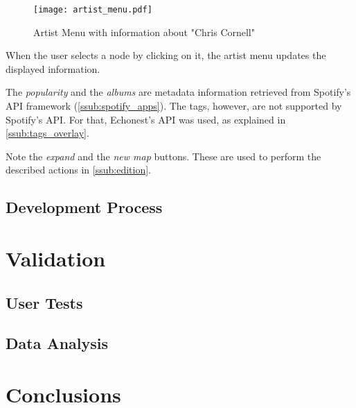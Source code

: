       \begin{figure}[tb]
        \begin{center}
          \texttt{[image: artist\_menu.pdf]}
        \end{center}
        \caption{Artist Menu with information about "Chris Cornell"}
        \label{fig:artist_menu}
      \end{figure}

      When the user selects a node by clicking on it, the artist menu updates the displayed information.

      The \emph{popularity} and the \emph{albums} are metadata information retrieved from Spotify's API framework (\ref{ssub:spotify_apps}).
      The tags, however, are not supported by Spotify's API.
      For that, Echonest's API was used, as explained in \ref{ssub:tags_overlay}.

      Note the \emph{expand} and the \emph{new map} buttons.
      These are used to perform the described actions in \ref{ssub:edition}.




  \subsection{Development Process} %
    \label{sub:development_process}



\section{Validation} %
\label{sec:validation}


  \subsection{User Tests} %
  \label{sub:user_tests}
  

  \subsection{Data Analysis} %
  \label{sub:data_analysis}
  


\section{Conclusions} %
  \label{sec:conclusions}



